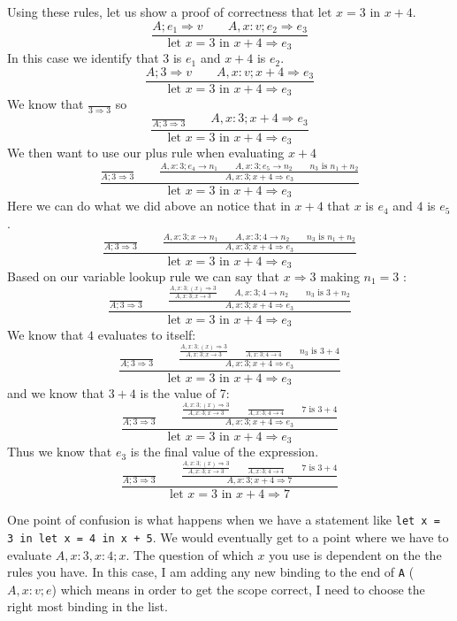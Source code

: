 \documentclass[main.tex]{subfiles}
\begin{document}
Using these rules, let us show a proof of correctness that $\text{let } x = 3 \text{ in } x + 4$.
$$
\frac{A;e_1 \Rightarrow v \qquad A,x:v;e_2 \Rightarrow e_3}{\text{let } x = 3 \text{ in } x + 4 \Rightarrow e_3}
$$
In this case we identify that $3$ is $e_1$ and $x+4$ is $e_2$.
$$
\frac{A;3 \Rightarrow v \qquad A,x:v;x+4 \Rightarrow e_3}{\text{let } x = 3 \text{ in } x + 4 \Rightarrow e_3}
$$
We know that $\frac{}{3 \Rightarrow 3}$ so 
$$
\frac{\frac{}{A;3 \Rightarrow 3} \qquad A,x:3;x+4 \Rightarrow e_3}{\text{let } x = 3 \text{ in } x + 4 \Rightarrow e_3}
$$
We then want to use our plus rule when evaluating $x+4$
$$
\frac{\frac{}{A;3 \Rightarrow 3} \qquad \frac{A,x:3;e_4 \rightarrow n_1 \qquad A,x:3;e_5 \rightarrow n_2 \qquad n_3 \text{ is } n_1 + n_2}{A,x:3;x+4 \Rightarrow e_3}}{\text{let } x = 3 \text{ in } x + 4 \Rightarrow e_3}
$$
Here we can do what we did above an notice that in $x + 4$ that $x$ is $e_4$ and $4$ is $e_5$.
$$
\frac{\frac{}{A;3 \Rightarrow 3} \qquad \frac{A,x:3;x \rightarrow n_1 \qquad A,x:3;4 \rightarrow n_2 \qquad n_3 \text{ is } n_1 + n_2}{A,x:3;x+4 \Rightarrow e_3}}{\text{let } x = 3 \text{ in } x + 4 \Rightarrow e_3}
$$
Based on our variable lookup rule we can say that $x \Rightarrow 3$ making $n_1 =3$ :
$$
\frac{\frac{}{A;3 \Rightarrow 3} \qquad \frac{\frac{A,x:3;(x) \Rightarrow 3}{A,x:3;x \rightarrow 3} \qquad A,x:3;4 \rightarrow n_2 \qquad n_3 \text{ is } 3 + n_2}{A,x:3;x+4 \Rightarrow e_3}}{\text{let } x = 3 \text{ in } x + 4 \Rightarrow e_3}
$$
We know that $4$ evaluates to itself:
$$
\frac{\frac{}{A;3 \Rightarrow 3} \qquad \frac{\frac{A,x:3;(x) \Rightarrow 3}{A,x:3;x \rightarrow 3} \qquad \frac{}{A,x:3;4 \rightarrow 4} \qquad n_3 \text{ is } 3 + 4}{A,x:3;x+4 \Rightarrow e_3}}{\text{let } x = 3 \text{ in } x + 4 \Rightarrow e_3}
$$
and we know that $3+4$ is the value of 7:
$$
\frac{\frac{}{A;3 \Rightarrow 3} \qquad \frac{\frac{A,x:3;(x) \Rightarrow 3}{A,x:3;x \rightarrow 3} \qquad \frac{}{A,x:3;4 \rightarrow 4} \qquad 7 \text{ is } 3 + 4}{A,x:3;x+4 \Rightarrow e_3}}{\text{let } x = 3 \text{ in } x + 4 \Rightarrow e_3}
$$
Thus we know that $e_3$ is the final value of the expression.
$$
\frac{\frac{}{A;3 \Rightarrow 3} \qquad \frac{\frac{A,x:3;(x) \Rightarrow 3}{A,x:3;x \rightarrow 3} \qquad \frac{}{A,x:3;4 \rightarrow 4} \qquad 7 \text{ is } 3 + 4}{A,x:3;x+4 \Rightarrow 7}}{\text{let } x = 3 \text{ in } x + 4 \Rightarrow 7}
$$

One point of confusion is what happens when we have a statement like \texttt{let  x = 3 in let x = 4 in x + 5}. We would eventually get to a point where we have to evaluate $A,x:3,x:4;x$. The question of which $x$ you use is dependent on the the rules you have. In this case, I am adding any new binding to the end of \texttt{A} ($A,x:v;e$) which means in order to get the scope correct, I need to choose the right most binding in the list. 
\end{document}
